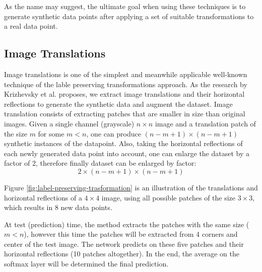 As the name may suggest, the ultimate goal when using these techniques is to generate synthetic data points after applying a set of suitable transformations to a real data point.

\subsection{Image Translations}
Image translations is one of the simplest and meanwhile applicable well-known technique of the lable
preserving transformations approach. As the research by Krizhevsky et al.
\cite{image_translation_paper} proposes, we extract
image translations and their horizontal reflections to generate the synthetic data and augment the
dataset. Image translation consists of extracting patches that are smaller in size than original
images. Given a single channel (grayscale) $n \times n$ image and a translation patch of the size
$m$ for some $m<n$, one can produce $(n-m+1) \times (n-m+1) $ synthetic instances of the datapoint. Also, taking
the horizontal reflections of each newly generated data point into account, one can enlarge the
dataset by a factor of 2, therefore finally dataset can be enlarged by factor: $$2\times(n-m+1)\times(n-m+1)$$

Figure \ref{fig:label-preserving-trasformation} is an illustration of the translations and horizontal
reflections of a $4 \times 4$ image, using all
possible patches of the size $3 \times 3$, which results in $8$ new data points.

At test (prediction) time, the method extracts the patches with the same size ($m < n$), however this time the
patches will be extracted from 4 corners and center of the test image. The network predicts on these
five patches and their horizontal reflections (10 patches altogether). In the end, the average
on the softmax layer will be determined the final prediction.

